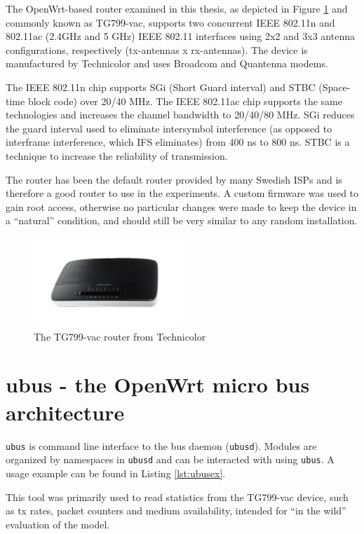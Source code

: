 The OpenWrt-based router examined in this thesis, as depicted in Figure
\ref{fig:tg799} and commonly known as TG799-vac, supports two concurrent IEEE
802.11n and 802.11ac (2.4GHz and 5 GHz) IEEE 802.11 interfaces using 2x2 and
3x3 antenna configurations, respectively (tx-antennas x rx-antennas).  The
device is manufactured by Technicolor and uses Broadcom and Quantenna modems.

The IEEE 802.11n chip supports SGi (Short Guard interval) and STBC (Space-time
block code) over 20/40 MHz. The IEEE 802.11ac chip supports the same
technologies and increases the channel bandwidth to 20/40/80 MHz. SGi reduces
the guard interval used to eliminate intersymbol interference (as opposed to
interframe interference, which IFS eliminates) from 400 ns to 800 ns. STBC is
a technique to increase the reliability of transmission.

The router has been the default router provided by many Swedish ISPs and is
therefore a good router to use in the experiments. A custom firmware was used to gain root access, otherwise no particular changes were
made to keep the device in a ``natural'' condition, and should still be very
similar to any random installation.

\begin{figure}
\center
\includegraphics[width=0.5\textwidth]{images/tg799.png}
\caption{The TG799-vac router from Technicolor}
\label{fig:tg799}
\end{figure}

\section{ubus - the OpenWrt micro bus architecture}

\texttt{ubus} is command line interface to the bus daemon (\texttt{ubusd}).
Modules are organized by namespaces in \texttt{ubusd} and can be interacted 
with using \texttt{ubus}. A usage example can be found in Listing \ref{lst:ubusex}.

This tool was primarily used to read statistics from the TG799-vac device,
such as tx rates, packet counters and medium availability, intended for ``in
the wild'' evaluation of the model.

